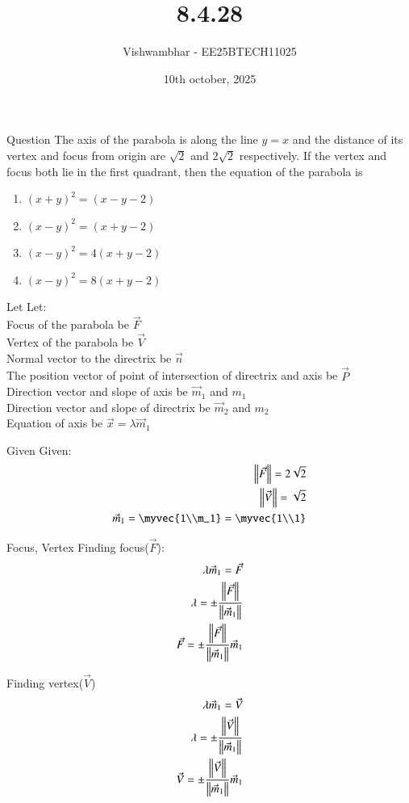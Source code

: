 \documentclass{beamer}
\title{8.4.28}
\date{10th october, 2025}
\author{Vishwambhar - EE25BTECH11025}
\begin{document}
\frame{\titlepage}
\begin{frame}{Question}
The axis of the parabola is along the line $y=x$ and the distance of its vertex and focus from origin are $\sqrt{2}$ and $2\sqrt{2}$ respectively. If the vertex and focus both lie in the first quadrant, then the equation of the parabola is
\begin{enumerate}
    \item $(x+y)^2=(x-y-2)$
    \item $(x-y)^2=(x+y-2)$
    \item $(x-y)^2=4(x+y-2)$
    \item $(x-y)^2=8(x+y-2)$
\end{enumerate}\end{frame}

\begin{frame}{Let}
Let:\\
Focus of the parabola be $\vec{F}$\\
Vertex of the parabola be $\vec{V}$\\
Normal vector to the directrix be $\vec{n}$\\
The position vector of point of intersection of directrix and axis be $\vec{P}$\\
Direction vector and slope of axis be $\vec{m}_1$ and $m_1$\\
Direction vector and slope of directrix be $\vec{m}_2$ and $m_2$\\
Equation of axis be $\vec{x}=\lambda\vec{m}_1$\\
\end{frame}

\begin{frame}{Given}
Given:
\begin{align}
    \norm{\vec{F}} = 2\sqrt{2}\\
    \norm{\vec{V}} = \sqrt{2}\\
    \vec{m}_1 = \myvec{1\\m_1}=\myvec{1\\1}
\end{align}
\end{frame}

\begin{frame}{Focus, Vertex}
Finding focus($\vec{F}$):
\begin{align}
    \lambda\vec{m}_1=\vec{F}\\
    \lambda = \pm\frac{\norm{\vec{F}}}{\norm{\vec{m}_1}}\\
    \vec{F} = \pm\frac{\norm{\vec{F}}}{\norm{\vec{m}_1}}\vec{m}_1
\end{align}

Finding vertex($\vec{V}$)
\begin{align}
    \lambda\vec{m}_1=\vec{V}\\
    \lambda = \pm\frac{\norm{\vec{V}}}{\norm{\vec{m}_1}}\\
    \vec{V} = \pm\frac{\norm{\vec{V}}}{\norm{\vec{m}_1}}\vec{m}_1
\end{align}
\end{frame}
\end{document}
